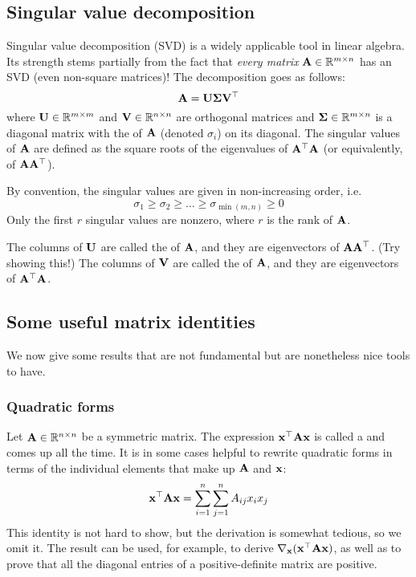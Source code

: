 \subsection{Singular value decomposition}
Singular value decomposition (SVD) is a widely applicable tool in linear algebra.
Its strength stems partially from the fact that \textit{every matrix} $\mathbf{A} \in \mathbb{R}^{m \times n}$ has an SVD (even non-square matrices)!
The decomposition goes as follows:
\[\mathbf{A} = \mathbf{U}\mathbf{\Sigma}\mathbf{V}^\top\]
where $\mathbf{U} \in \mathbb{R}^{m \times m}$ and $\mathbf{V} \in \mathbb{R}^{n \times n}$ are orthogonal matrices and $\mathbf{\Sigma} \in \mathbb{R}^{m \times n}$ is a diagonal matrix with the  of $\mathbf{A}$ (denoted $\sigma_i$) on its diagonal.
The singular values of $\mathbf{A}$ are defined as the square roots of the eigenvalues of $\mathbf{A}^\top\mathbf{A}$ (or equivalently, of $\mathbf{A}\mathbf{A}^\top$).

By convention, the singular values are given in non-increasing order, i.e.
\[\sigma_1 \geq \sigma_2 \geq \dots \geq \sigma_{\min(m,n)} \geq 0\]
Only the first $r$ singular values are nonzero, where $r$ is the rank of $\mathbf{A}$.

The columns of $\mathbf{U}$ are called the  of $\mathbf{A}$, and they are eigenvectors of $\mathbf{A}\mathbf{A}^\top$.
(Try showing this!)
The columns of $\mathbf{V}$ are called the  of $\mathbf{A}$, and they are eigenvectors of $\mathbf{A}^\top\mathbf{A}$.

\subsection{Some useful matrix identities}
We now give some results that are not fundamental but are nonetheless nice tools to have.

\subsubsection{Quadratic forms}
Let $\mathbf{A} \in \mathbb{R}^{n \times n}$ be a symmetric matrix.
The expression $\mathbf{x}^\top\mathbf{A}\mathbf{x}$ is called a  and comes up all the time.
It is in some cases helpful to rewrite quadratic forms in terms of the individual elements that make up $\mathbf{A}$ and $\mathbf{x}$:
\[\mathbf{x}^\top\mathbf{A}\mathbf{x} = \sum_{i=1}^n\sum_{j=1}^n A_{ij}x_ix_j\]
This identity is not hard to show, but the derivation is somewhat tedious, so we omit it.
The result can be used, for example, to derive $\nabla_{\mathbf{x}}(\mathbf{x}^\top\mathbf{A}\mathbf{x})$, as well as to prove that all the diagonal entries of a positive-definite matrix are positive.

